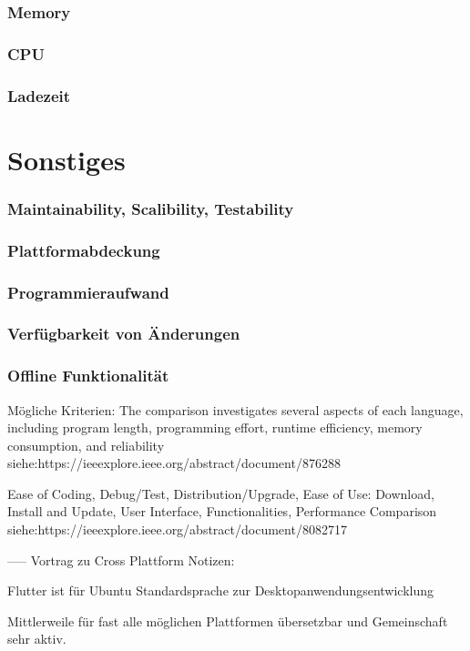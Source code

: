 \subsubsection{Memory}
\subsubsection{CPU}
\subsubsection{Ladezeit}

\section{Sonstiges}
\subsubsection{Maintainability, Scalibility, Testability}
\subsubsection{Plattformabdeckung}
\subsubsection{Programmieraufwand}
\subsubsection{Verfügbarkeit  von Änderungen}
\subsubsection{Offline Funktionalität}




Mögliche Kriterien:
The comparison investigates several aspects of each language, including program length, programming effort, runtime efficiency, memory consumption, and reliability
siehe:https://ieeexplore.ieee.org/abstract/document/876288

Ease of Coding, Debug/Test, Distribution/Upgrade, Ease of Use: Download, Install and Update, User Interface, Functionalities, Performance Comparison 
siehe:https://ieeexplore.ieee.org/abstract/document/8082717

-----
Vortrag zu Cross Plattform Notizen:

Flutter ist für Ubuntu Standardsprache zur Desktopanwendungsentwicklung

Mittlerweile für fast alle möglichen Plattformen übersetzbar und Gemeinschaft sehr aktiv.

